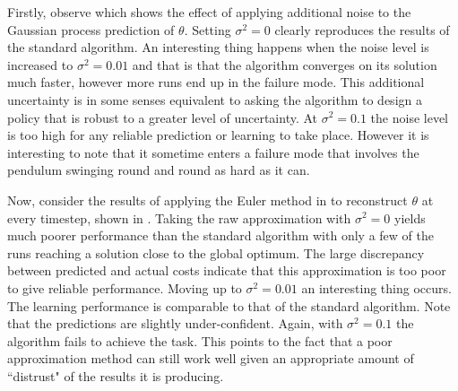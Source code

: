 Firstly, observe  which shows the effect of applying additional noise to the Gaussian process prediction of $\theta$. Setting $\sigma^2=0$ clearly reproduces the results of the standard algorithm. An interesting thing happens when the noise level is increased to $\sigma^2=0.01$ and that is that the algorithm converges on its solution much faster, however more runs end up in the failure mode. This additional uncertainty is in some senses equivalent to asking the algorithm to design a policy that is robust to a greater level of uncertainty. At $\sigma^2=0.1$ the noise level is too high for any reliable prediction or learning to take place. However it is interesting to note that it sometime enters a failure mode that involves the pendulum swinging round and round as hard as it can.

Now, consider the results of applying the Euler method in  to reconstruct $\theta$ at every timestep, shown in . Taking the raw approximation with $\sigma^2=0$ yields much poorer performance than the standard algorithm with only a few of the runs reaching a solution close to the global optimum. The large discrepancy between predicted and actual costs indicate that this approximation is too poor to give reliable performance. Moving up to $\sigma^2=0.01$ an interesting thing occurs. The learning performance is comparable to that of the standard algorithm. Note that the predictions are slightly under-confident. Again, with $\sigma^2=0.1$ the algorithm fails to achieve the task. This points to the fact that a poor approximation method can still work well given an appropriate amount of ``distrust" of the results it is producing.

